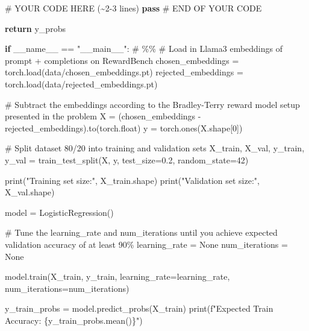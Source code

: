 \documentclass[
  letterpaper,
  numbers=noenddot,
  DIV=11]{scrreprt}
\newenvironment{Shaded}{\begin{snugshade}}{\end{snugshade}}
\newcommand{\BuiltInTok}[1]{\textcolor[rgb]{0.00,0.23,0.31}{#1}}
\newcommand{\CommentTok}[1]{\textcolor[rgb]{0.37,0.37,0.37}{#1}}
\newcommand{\ControlFlowTok}[1]{\textcolor[rgb]{0.00,0.23,0.31}{\textbf{#1}}}
\newcommand{\DecValTok}[1]{\textcolor[rgb]{0.68,0.00,0.00}{#1}}
\newcommand{\FloatTok}[1]{\textcolor[rgb]{0.68,0.00,0.00}{#1}}
\newcommand{\NormalTok}[1]{\textcolor[rgb]{0.00,0.23,0.31}{#1}}
\newcommand{\OperatorTok}[1]{\textcolor[rgb]{0.37,0.37,0.37}{#1}}
\newcommand{\RegionMarkerTok}[1]{\textcolor[rgb]{0.00,0.23,0.31}{#1}}
\newcommand{\SpecialCharTok}[1]{\textcolor[rgb]{0.37,0.37,0.37}{#1}}
\newcommand{\SpecialStringTok}[1]{\textcolor[rgb]{0.13,0.47,0.30}{#1}}
\newcommand{\StringTok}[1]{\textcolor[rgb]{0.13,0.47,0.30}{#1}}
\newcommand{\VariableTok}[1]{\textcolor[rgb]{0.07,0.07,0.07}{#1}}
\theoremstyle{definition}
\theoremstyle{plain}
\theoremstyle{plain}
\theoremstyle{remark}
\begin{document}
\begin{tcolorbox}[colframe=.grey, title=\faCode \enspace Code]
\begin{Shaded}
\begin{Highlighting}[numbers=left,,]
        \CommentTok{\# YOUR CODE HERE (\textasciitilde{}2{-}3 lines)}
        \ControlFlowTok{pass}
        \CommentTok{\# }\RegionMarkerTok{END}\CommentTok{ OF YOUR CODE}

        \ControlFlowTok{return}\NormalTok{ y\_probs}


\ControlFlowTok{if} \VariableTok{\_\_name\_\_} \OperatorTok{==} \StringTok{"\_\_main\_\_"}\NormalTok{:}
    \CommentTok{\# \%\%}
    \CommentTok{\# Load in Llama3 embeddings of prompt + completions on RewardBench}
\NormalTok{    chosen\_embeddings }\OperatorTok{=}\NormalTok{ torch.load(}\StringTok{\textquotesingle{}data/chosen\_embeddings.pt\textquotesingle{}}\NormalTok{)}
\NormalTok{    rejected\_embeddings }\OperatorTok{=}\NormalTok{ torch.load(}\StringTok{\textquotesingle{}data/rejected\_embeddings.pt\textquotesingle{}}\NormalTok{)}

    \CommentTok{\# Subtract the embeddings according to the Bradley{-}Terry reward model setup presented in the problem }
\NormalTok{    X }\OperatorTok{=}\NormalTok{ (chosen\_embeddings }\OperatorTok{{-}}\NormalTok{ rejected\_embeddings).to(torch.}\BuiltInTok{float}\NormalTok{)}
\NormalTok{    y }\OperatorTok{=}\NormalTok{ torch.ones(X.shape[}\DecValTok{0}\NormalTok{])}

    \CommentTok{\# Split dataset 80/20 into training and validation sets}
\NormalTok{    X\_train, X\_val, y\_train, y\_val }\OperatorTok{=}\NormalTok{ train\_test\_split(X, y, test\_size}\OperatorTok{=}\FloatTok{0.2}\NormalTok{, random\_state}\OperatorTok{=}\DecValTok{42}\NormalTok{)  }

    \BuiltInTok{print}\NormalTok{(}\StringTok{"Training set size:"}\NormalTok{, X\_train.shape)}
    \BuiltInTok{print}\NormalTok{(}\StringTok{"Validation set size:"}\NormalTok{, X\_val.shape)}

\NormalTok{    model }\OperatorTok{=}\NormalTok{ LogisticRegression()}

    \CommentTok{\# Tune the learning\_rate and num\_iterations until you achieve expected validation accuracy of at least 90\%}
\NormalTok{    learning\_rate }\OperatorTok{=} \VariableTok{None}
\NormalTok{    num\_iterations }\OperatorTok{=} \VariableTok{None}

\NormalTok{    model.train(X\_train, y\_train, learning\_rate}\OperatorTok{=}\NormalTok{learning\_rate, num\_iterations}\OperatorTok{=}\NormalTok{num\_iterations)}

\NormalTok{    y\_train\_probs }\OperatorTok{=}\NormalTok{ model.predict\_probs(X\_train)}
    \BuiltInTok{print}\NormalTok{(}\SpecialStringTok{f"Expected Train Accuracy: }\SpecialCharTok{\{}\NormalTok{y\_train\_probs}\SpecialCharTok{.}\NormalTok{mean()}\SpecialCharTok{\}}\SpecialStringTok{"}\NormalTok{)}


\end{Highlighting}
\end{Shaded}
\end{tcolorbox}
\end{document}
